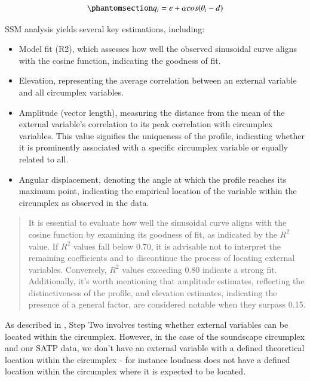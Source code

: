 \documentclass[
  authoryear,
  preprint,
  3p]{elsarticle}
\providecommand{\tightlist}{%
  \setlength{\itemsep}{0pt}\setlength{\parskip}{0pt}}\usepackage{longtable,booktabs,array}
\begin{document}
\begin{equation}\phantomsection\label{eq-ssm}{
q_i = e + \alpha cos(\theta_i - d)
}\end{equation}

SSM analysis yields several key estimations, including:

\begin{itemize}
\tightlist
\item
  Model fit (R2), which assesses how well the observed sinusoidal curve
  aligns with the cosine function, indicating the goodness of fit.
\item
  Elevation, representing the average correlation between an external
  variable and all circumplex variables.
\item
  Amplitude (vector length), measuring the distance from the mean of the
  external variable's correlation to its peak correlation with
  circumplex variables. This value signifies the uniqueness of the
  profile, indicating whether it is prominently associated with a
  specific circumplex variable or equally related to all.
\item
  Angular displacement, denoting the angle at which the profile reaches
  its maximum point, indicating the empirical location of the variable
  within the circumplex as observed in the data.
\end{itemize}

\begin{quote}
It is essential to evaluate how well the sinusoidal curve aligns with
the cosine function by examining its goodness of fit, as indicated by
the \(R^2\) value. If \(R^2\) values fall below 0.70, it is advisable
not to interpret the remaining coefficients and to discontinue the
process of locating external variables. Conversely, \(R^2\) values
exceeding 0.80 indicate a strong fit. Additionally, it's worth
mentioning that amplitude estimates, reflecting the distinctiveness of
the profile, and elevation estimates, indicating the presence of a
general factor, are considered notable when they surpass 0.15.
\end{quote}

As described in \citet{Rogoza2021three}, Step Two involves testing
whether external variables can be located within the circumplex.
However, in the case of the soundscape circumplex and our SATP data, we
don't have an external variable with a defined theoretical location
within the circumplex - for instance loudness does not have a defined
location within the circumplex where it is expected to be located.
\end{document}

